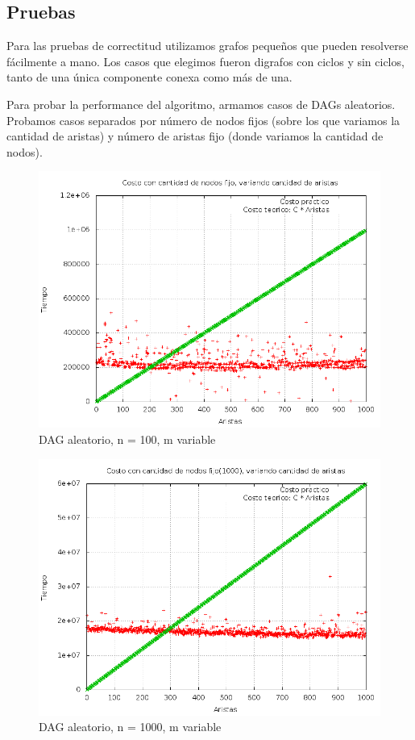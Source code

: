 \subsection{Pruebas}
Para las pruebas de correctitud utilizamos grafos peque\~nos que pueden resolverse f\'acilmente a mano. 
Los casos que elegimos fueron digrafos con ciclos y sin ciclos, tanto de una \'unica componente conexa como m\'as de una.


Para probar la performance del algoritmo, armamos casos de DAGs aleatorios. Probamos casos separados por n\'umero de nodos fijos (sobre los que variamos la cantidad de aristas) y n\'umero de aristas fijo (donde variamos la cantidad de nodos). 


\begin{figure}[H]
	\centering
	\includegraphics[scale=0.5]{dag_100.png}
	\caption{DAG aleatorio, n = 100, m variable}
\end{figure}

\begin{figure}[H]
	\centering
	\includegraphics[scale=0.5]{dag_1000.png}
	\caption{DAG aleatorio, n = 1000, m variable}
\end{figure}


